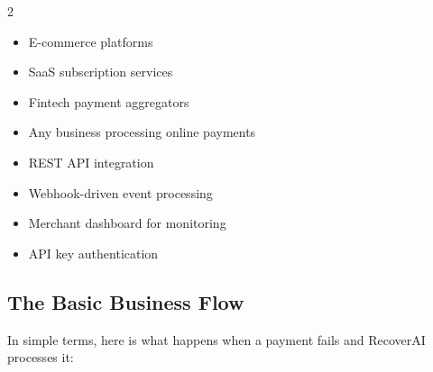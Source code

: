 \begin{multicols}{2}
\begin{tcolorbox}[featurebox={Primary Users}]
\begin{itemize}
    \item E-commerce platforms
    \item SaaS subscription services
    \item Fintech payment aggregators
    \item Any business processing online payments
\end{itemize}
\end{tcolorbox}

\columnbreak

\begin{tcolorbox}[featurebox={Integration Model}]
\begin{itemize}
    \item REST API integration
    \item Webhook-driven event processing
    \item Merchant dashboard for monitoring
    \item API key authentication
\end{itemize}
\end{tcolorbox}
\end{multicols}

\vspace{0.5cm}

\subsection{The Basic Business Flow}

In simple terms, here is what happens when a payment fails and RecoverAI processes it:

\vspace{0.3cm}

